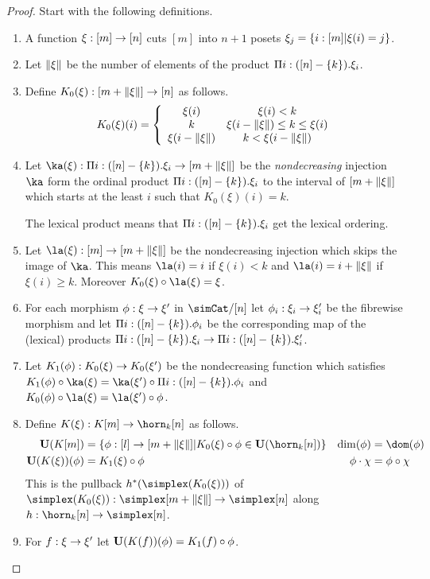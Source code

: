 \begin{proof} Start with the following definitions.
\begin{enumerate}
\item A function $\xi:[m]\to[n]$ cuts $[m]$ into $n+1$ posets $\xi_j = \left\{i:[m]|\xi(i)=j\right\}$. 
\item Let $\Vert \xi \Vert$ be the number of elements of the product $\Pi i: ([n]-\left\{k\right\}).\xi_i$. 
\item Define $K_0(\xi): [m+\Vert \xi \Vert]\to [n]$ as follows.
\[ 
	K_0(\xi)(i) = \left\{
		\begin{array}{cc}
			\xi(i) & \xi(i)<k \\
			k & \xi(i-\Vert \xi \Vert)\leq k \leq \xi(i)\\
			\xi(i-\Vert \xi \Vert) & k<\xi(i-\Vert \xi \Vert)
		\end{array}
	\right.
\]
\item Let $\ka(\xi)\of\Pi i\of([n]-\set k).\xi_i \to [m+\norm\xi]$ be the \emph{nondecreasing} injection $\ka$ form the ordinal product $\Pi i:([n]-\left\{k\right\}).\xi_i$ to the interval of $[m+\Vert \xi \Vert]$ which starts at the least $i$ such that $K_0(\xi)(i)=k$.

The lexical product means that $\Pi i:([n]-\left\{k\right\}).\xi_i$ get the lexical ordering. %

\item Let $\la(\xi)\of[m]\to[m+\norm\xi]$ be the nondecreasing injection which skips the image of $\ka$. This means $\la(i)=i$ if $\xi(i)<k$ and $\la(i)=i+\norm\xi$ if $\xi(i)\geq k$. Moreover $K_0(\xi)\circ\la(\xi) = \xi$.
\item For each morphism $\phi:\xi\to\xi'$ in $\simCat/[n]$ let $\phi_i:\xi_i\to\xi'_i$ be the fibrewise morphism and let $\Pi i:([n]-\left\{k\right\}).\phi_i$ be the corresponding map of the (lexical) products $\Pi i:([n]-\left\{k\right\}).\xi_i\to\Pi i:([n]-\left\{k\right\}).\xi'_i$.
\item Let $K_1(\phi): K_0(\xi)\to K_0(\xi')$ be the nondecreasing function which satisfies $K_1(\phi)\circ \ka(\xi) = \ka(\xi')\circ \Pi i\of([n]-\set k).\phi_i$ and $K_0(\phi)\circ \la(\xi) = \la(\xi')\circ \phi$.
\item Define $K(\xi)\of K[m]\to\horn_k[n]$ as follows.
\begin{align*}
\base(K[m]) &= \set{\phi\of [l]\to [m+\norm\xi]|K_0(\xi)\circ\phi\in\base(\horn_k[n]) } & \dim(\phi) &= \dom(\phi) \\
\base(K(\xi))(\phi) &= K_1(\xi)\circ\phi & \phi\cdot\chi &= \phi\circ\chi
\end{align*}
This is the pullback $h\ri(\simplex(K_0(\xi)))$ of $\simplex(K_0(\xi))\of\simplex[m+\norm\xi]\to\simplex[n]$ along $h\of\horn_k[n]\to\simplex[n]$.
\item For $f: \xi\to\xi'$ let $\mathbf{U}(K(f))(\phi) = K_1(f)\circ \phi$.
\end{enumerate}


\end{proof}
